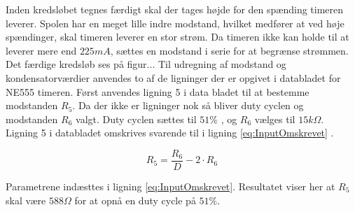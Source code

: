 Inden kredsløbet tegnes færdigt skal der tages højde for den spænding timeren leverer. Spolen har en meget lille indre modstand, hvilket medfører at ved høje spændinger, skal timeren leverer en stor strøm. Da timeren ikke kan holde til at leverer mere end $225 mA$, sættes en modstand i serie for at begrænse strømmen. Det færdige kredsløb ses på figur...
Til udregning af modstand og kondensatorværdier anvendes to af de ligninger der er opgivet i databladet for NE555 timeren. Først anvendes ligning 5 i data bladet til at bestemme modstanden $R_5$. Da der ikke er ligninger nok så bliver duty cyclen og modstanden $R_6$ valgt. Duty cyclen sættes til $51 \% $ , og $R_6$ vælges til $15k \Omega $. Ligning 5 i databladet omskrives svarende til i ligning \ref{eq:InputOmskrevet} .

\begin{equation}
\label{eq:InputOmskrevet}
R_5 = \frac{R_6}{D} - 2 \cdot R_6
\end{equation}

Parametrene indæsttes i ligning \ref{eq:InputOmskrevet}.
Resultatet viser her at $R_5$ skal være $588 \Omega $ for at opnå en duty cycle på $51 \% $.